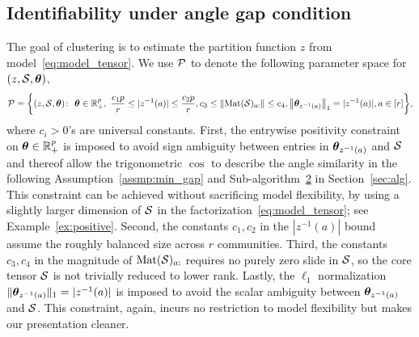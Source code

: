 \documentclass[lettersize,onecolumn,journal]{IEEEtran}
\theoremstyle{definition}
\theoremstyle{definition}
\newtheorem{example}{Example}
\begin{document}

\subsection{Identifiability under angle gap condition}
The goal of clustering is to estimate the partition function $z$ from model~\eqref{eq:model_tensor}. We use $\mathcal{P}$ to denote the following parameter space for $(z,\mathcal{S},\boldsymbol{\theta})$,
\begin{align}\label{eq:family}
\tP=\bigg\{(z,\tS,\mtheta)\colon  \ \mtheta\in\mathbb{R}^p_{+},\ 
{c_1p\over r}\leq |z^{-1}(a)|\leq {c_2 p\over r}, c_3\leq \onormSize{}{\text{Mat}(\tS)_{a:}}\leq c_4, \onorm{\mtheta_{z^{-1}(a)}}_1=|z^{-1}(a)|, a\in[r]\bigg\},
\end{align}
\normalsize
where $c_i>0$'s are universal constants.  
First, the entrywise positivity constraint on  $\boldsymbol{\theta}\in\mathbb{R}^p_{+}$ is imposed to avoid sign ambiguity between entries in $\boldsymbol{\theta}_{z^{-1}(a)}$ and $\mathcal{S}$ {\color{blue} and thereof allow the trigonometric $\cos$ to describe the angle similarity in the following Assumption~\ref{assmp:min_gap} and Sub-algorithm~\hyperref[alg:main]{2} in Section~\ref{sec:alg}}. This constraint can be achieved without sacrificing model flexibility, by using a slightly larger dimension of $\mathcal{S}$ in the factorization~\eqref{eq:model_tensor}; see Example~\ref{ex:positive}. Second, 
the constants $c_1, c_2$ in the $|z^{-1}(a)|$ bound assume the roughly balanced size across $r$ communities. Third, the constants $c_3, c_4 $ in the magnitude of $\text{Mat}(\mathcal{S})_{a:}$ requires no purely zero slide in $\mathcal{S}$, so the core tensor $\mathcal{S}$ is not trivially reduced to lower rank. Lastly, the $\ell_1$ normalization $\lVert\boldsymbol{\theta}_{z^{-1}(a)}\rVert_1=|z^{-1}(a)|$ is imposed to avoid the scalar ambiguity between $\boldsymbol{\theta}_{z^{-1}(a)}$ and $\mathcal{S}$. This constraint, again, incurs no restriction to model flexibility but makes our presentation cleaner. 
\end{document}
